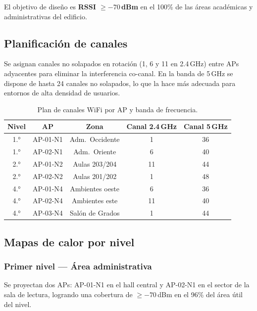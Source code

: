 El objetivo de diseño es \textbf{RSSI $\geq -70$\,dBm} en el 100\% de las áreas
académicas y administrativas del edificio.

\subsection{Planificación de canales}

Se asignan canales no solapados en rotación (1, 6 y 11 en 2.4\,GHz) entre APs
adyacentes para eliminar la interferencia co-canal. En la banda de 5\,GHz se
dispone de hasta 24 canales no solapados, lo que la hace más adecuada para
entornos de alta densidad de usuarios.

\begin{table}[H]
    \centering
    \caption{Plan de canales WiFi por AP y banda de frecuencia.}
    \label{tab:canales_wifi}
    \begin{tabular}{|c|c|c|c|c|}
        \hline
        \textbf{Nivel} & \textbf{AP} & \textbf{Zona} &
        \textbf{Canal 2.4\,GHz} & \textbf{Canal 5\,GHz} \\
        \hline
        1.° & AP-01-N1 & Adm.\ Occidente   & 1  & 36 \\
        1.° & AP-02-N1 & Adm.\ Oriente     & 6  & 40 \\
        2.° & AP-01-N2 & Aulas 203/204     & 11 & 44 \\
        2.° & AP-02-N2 & Aulas 201/202     & 1  & 48 \\
        4.° & AP-01-N4 & Ambientes oeste   & 6  & 36 \\
        4.° & AP-02-N4 & Ambientes este    & 11 & 40 \\
        4.° & AP-03-N4 & Salón de Grados   & 1  & 44 \\
        \hline
    \end{tabular}
\end{table}

\subsection{Mapas de calor por nivel}

\subsubsection{Primer nivel — Área administrativa}

Se proyectan dos APs: AP-01-N1 en el hall central y AP-02-N1 en el sector de
la sala de lectura, logrando una cobertura de $\geq -70$\,dBm en el 96\% del
área útil del nivel.

